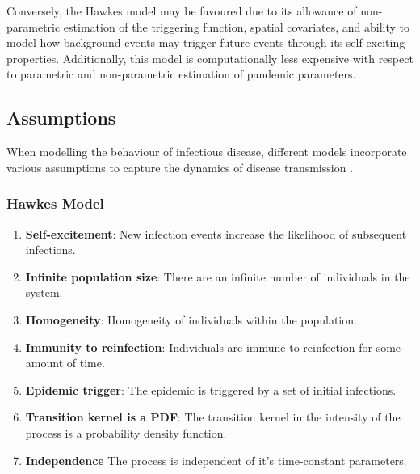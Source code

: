 \documentclass[12pt]{article}
\begin{document}
Conversely, the Hawkes model may be favoured due to its allowance of non-parametric estimation of the triggering function, spatial covariates, and ability to model how background events may trigger future events through its self-exciting properties. Additionally, this model is computationally less expensive with respect to parametric and non-parametric estimation of pandemic parameters. 



\subsection{Assumptions}
When modelling the behaviour of infectious disease, different models incorporate various assumptions to capture the dynamics of disease transmission \cite{Kresin2022, Lamprinakou2023}. 


\subsubsection{Hawkes Model}
\begin{enumerate}
\item {\bf Self-excitement}: New infection events increase the likelihood of subsequent infections. 
\item {\bf Infinite population size}: There are an infinite number of individuals in the system.
\item {\bf Homogeneity}: Homogeneity of individuals within the population.
\item {\bf Immunity to reinfection}: Individuals are immune to reinfection for some amount of time. 
\item {\bf Epidemic trigger}: The epidemic is triggered by a set of initial infections.
\item {\bf Transition kernel is a PDF}: The transition kernel in the intensity of the process is a probability density function. 
\item {\bf Independence} The process is independent of it's time-constant parameters. 
\end{enumerate}
\end{document}
